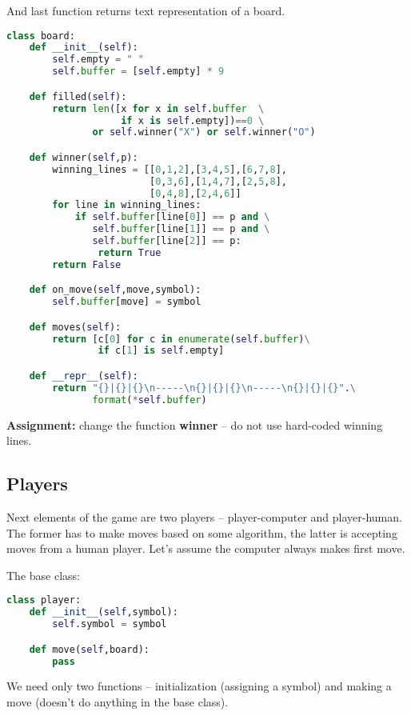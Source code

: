 And last function returns text representation of a board.

\newpage

\begin{lstlisting}[language=Python,style=codelst2,caption={Tic-Tac-Toe: board}]
class board:
    def __init__(self):
        self.empty = " "
        self.buffer = [self.empty] * 9

    def filled(self):
        return len([x for x in self.buffer  \
                    if x is self.empty])==0 \
               or self.winner("X") or self.winner("O")

    def winner(self,p):
        winning_lines = [[0,1,2],[3,4,5],[6,7,8],
                         [0,3,6],[1,4,7],[2,5,8],
                         [0,4,8],[2,4,6]]
        for line in winning_lines:
            if self.buffer[line[0]] == p and \
               self.buffer[line[1]] == p and \
               self.buffer[line[2]] == p:
                return True
        return False

    def on_move(self,move,symbol):
        self.buffer[move] = symbol

    def moves(self):
        return [c[0] for c in enumerate(self.buffer)\
                if c[1] is self.empty]

    def __repr__(self):
        return "{}|{}|{}\n-----\n{}|{}|{}\n-----\n{}|{}|{}".\
               format(*self.buffer)
\end{lstlisting}

\begin{tcolorbox}
\textbf{Assignment:} change the function \textbf{winner} -- do not use
hard-coded winning lines.
\end{tcolorbox}

\subsection{Players}

Next elements of the game are two players -- player-computer and
player-human. The former has to make moves based on some algorithm,
the latter is accepting moves from a human player. Let's assume
the computer always makes first move.

The base class:

\begin{lstlisting}[language=Python,style=codelst2,caption={Tic-Tac-Toe: player, base class}]
class player:
    def __init__(self,symbol):
        self.symbol = symbol

    def move(self,board):
        pass
\end{lstlisting}
We need only two functions -- initialization (assigning a symbol)
and making a move (doesn't do anything in the base class).

